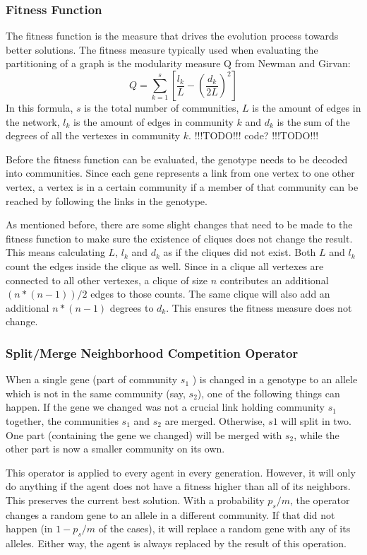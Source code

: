 \subsubsection{Fitness Function}
The fitness function is the measure that drives the evolution process towards better solutions. The fitness measure typically used when evaluating the partitioning of a graph is the modularity measure Q from Newman and Girvan\cite{Newman2004}:
\begin{equation}
Q = \sum_{k=1}^{s} \left[ \frac{l_{k}}{L} - \left( \frac{d_{k}}{2L} \right)^{2} \right]
\end{equation}
In this formula, $s$ is the total number of communities, $L$ is the amount of edges in the network, $l_{k}$ is the amount of edges in community $k$ and $d_{k}$ is the sum of the degrees of all the vertexes in community $k$. !!!TODO!!! code? !!!TODO!!!
\par
Before the fitness function can be evaluated, the genotype needs to be decoded into communities. Since each gene represents a link from one vertex to one other vertex, a vertex is in a certain community if a member of that community can be reached by following the links in the genotype.
\par
As mentioned before, there are some slight changes that need to be made to the fitness function to make sure the existence of cliques does not change the result. This means calculating $L$, $l_{k}$ and $d_{k}$ as if the cliques did not exist. Both $L$ and $l_{k}$ count the edges inside the clique as well. Since in a clique all vertexes are connected to all other vertexes, a clique of size $n$ contributes an additional $ (n * (n - 1))/2 $ edges to those counts. The same clique will also add an additional $n * (n - 1)$ degrees to $d_{k}$. This ensures the fitness measure does not change.
\subsubsection{Split/Merge Neighborhood Competition Operator}
When a single gene (part of community $s_1$ ) is changed in a genotype to an allele which is not in the same community (say, $s_2$), one of the following things can happen. If the gene we changed was not a crucial link holding community $s_1$ together, the communities $s_1$ and $s_2$ are merged. Otherwise, $s1$ will split in two. One part (containing the gene we changed) will be merged with $s_2$, while the other part is now a smaller community on its own.
\par
This operator is applied to every agent in every generation. However, it will only do anything if the agent does not have a fitness higher than all of its neighbors. This preserves the current best solution. With a probability $p_s/m$, the operator changes a random gene to an allele in a different community. If that did not happen (in $1 - p_s/m$ of the cases), it will replace a random gene with any of its alleles. Either way, the agent is always replaced by the result of this operation.

